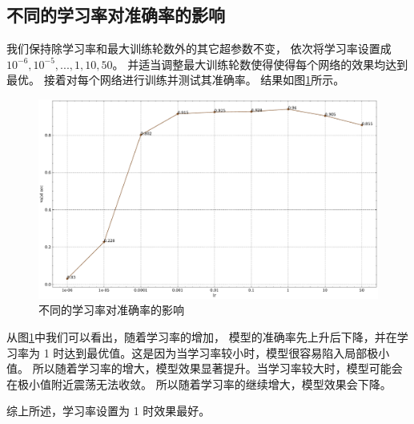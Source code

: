 \documentclass[supercite]{Experimental_Report}
\theoremstyle{definition}
\begin{document}
\subsection{不同的学习率对准确率的影响}
我们保持除学习率和最大训练轮数外的其它超参数不变，
依次将学习率设置成 $10^{-6}, 10^{-5}, ..., 1, 10, 50$。
并适当调整最大训练轮数使得使得每个网络的效果均达到最优。
接着对每个网络进行训练并测试其准确率。
结果如图\ref{不同的学习率}所示。
\begin{figure}[H]
	\begin{center}
		\includegraphics[scale=0.35]{../images/不同的学习率.pdf}
		\caption{不同的学习率对准确率的影响}
		\label{不同的学习率}
	\end{center}
\end{figure}

从图\ref{不同的学习率}中我们可以看出，随着学习率的增加，
模型的准确率先上升后下降，并在学习率为 1 时达到最优值。这是因为当学习率较小时，模型很容易陷入局部极小值。
所以随着学习率的增大，模型效果显著提升。当学习率较大时，模型可能会在极小值附近震荡无法收敛。
所以随着学习率的继续增大，模型效果会下降。

综上所述，学习率设置为 1 时效果最好。
\end{document}
